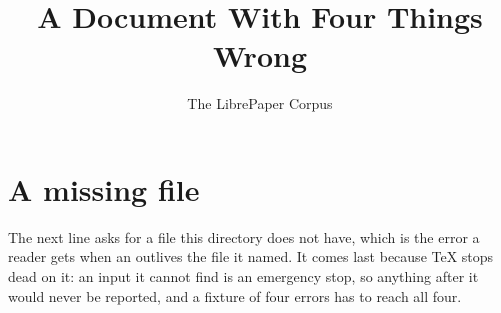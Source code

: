 \documentclass[11pt]{article}
\title{A Document With Four Things Wrong}
\author{The LibrePaper Corpus}
\date{}
\begin{document}
\maketitle



\section{A missing file}

The next line asks for a file this directory does not have, which is the
error a reader gets when an \verb|| outlives the file it named. It
comes last because \TeX{} stops dead on it: an input it cannot find is an
emergency stop, so anything after it would never be reported, and a fixture
of four errors has to reach all four.


\end{document}
